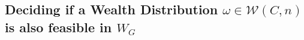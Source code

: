 \documentclass[10pt,twocolumn]{article}
\begin{document}
\subsection{Deciding if a Wealth Distribution $\omega\in\mathcal{W}(C,n)$ is also feasible in $W_G$}
\label{sec:isomorphism}
\end{document}
